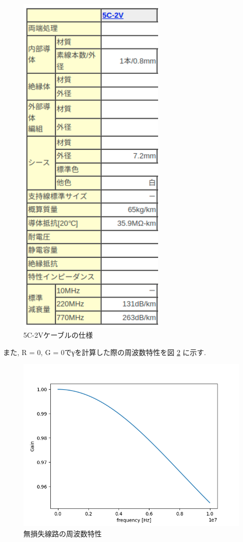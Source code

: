 \documentclass[a4j,12pt,]{jarticle}
\begin{document}
\begin{figure}[H]
  \begin{center}
    \includegraphics[width=70mm]{5c2v.png}
    \caption{5C-2Vケーブルの仕様}
    \label{p2}
  \end{center}
\end{figure}

また, R = 0, G = 0でγを計算した際の周波数特性を図 \ref{p5} に示す.

\begin{figure}[H]
  \begin{center}
    \includegraphics[width=150mm]{frequency_characteristic_lossless.png}
    \caption{無損失線路の周波数特性}
    \label{p5}
  \end{center}
\end{figure}
\end{document}
